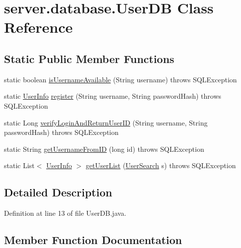 \hypertarget{classserver_1_1database_1_1_user_d_b}{}\section{server.\+database.\+User\+DB Class Reference}
\label{classserver_1_1database_1_1_user_d_b}
\subsection*{Static Public Member Functions}
\begin{DoxyCompactItemize}
\item 
static boolean \hyperlink{classserver_1_1database_1_1_user_d_b_af32ba65fd689f3566e77a8eb1b529264}{is\+Username\+Available} (String username)  throws S\+Q\+L\+Exception 
\item 
static \hyperlink{classsharedlib_1_1tuples_1_1_user_info}{User\+Info} \hyperlink{classserver_1_1database_1_1_user_d_b_a8d4ba4100ff7d292c1f3354f1c533c09}{register} (String username, String password\+Hash)  throws S\+Q\+L\+Exception 
\item 
static Long \hyperlink{classserver_1_1database_1_1_user_d_b_abfde8257ad4d22b2ce4c09de2074bc80}{verify\+Login\+And\+Return\+User\+ID} (String username, String password\+Hash)  throws S\+Q\+L\+Exception 
\item 
static String \hyperlink{classserver_1_1database_1_1_user_d_b_a13f56f4018e26fd3835d4d4104980300}{get\+Username\+From\+ID} (long id)  throws S\+Q\+L\+Exception 
\item 
static List$<$ \hyperlink{classsharedlib_1_1tuples_1_1_user_info}{User\+Info} $>$ \hyperlink{classserver_1_1database_1_1_user_d_b_a31c37dfb567cb36fd4f0d49cdde8a2be}{get\+User\+List} (\hyperlink{classsharedlib_1_1tuples_1_1_user_search}{User\+Search} s)  throws S\+Q\+L\+Exception 
\end{DoxyCompactItemize}


\subsection{Detailed Description}


Definition at line 13 of file User\+D\+B.\+java.



\subsection{Member Function Documentation}
\hypertarget{classserver_1_1database_1_1_user_d_b_a31c37dfb567cb36fd4f0d49cdde8a2be}{}\label{classserver_1_1database_1_1_user_d_b_a31c37dfb567cb36fd4f0d49cdde8a2be} 
